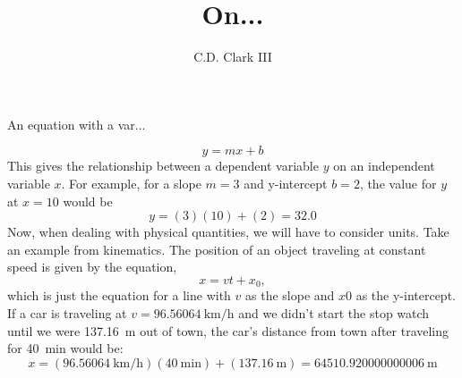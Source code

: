 \documentclass[]{article}
\author{C.D. Clark III}
\title{On...}
\begin{document}
\maketitle
An equation with a var...

$$
y = mx + b
$$
This gives the relationship between a dependent variable $y$ on an independent variable $x$.
For example, for a slope $m = 3$ and y-intercept $b = 2$, the value for $y$ at $x = 10$ would be
$$
y = (3)(10) + (2) = 32.0
$$
Now, when dealing with physical quantities, we will have to consider units. Take an example from kinematics. The
position of an object traveling at constant speed is given by the equation,
$$
x = v t + x_0,
$$
which is just the equation for a line with $v$ as the slope and $x0$ as the y-intercept. If a car is traveling at
$v = \SI[]{96.56064}{\kilo\meter\per\hour}$ and we didn't start the stop watch until we were \SI[]{137.16}{\meter} out of town, the car's distance from town
after traveling for \SI[]{40}{\minute} would be:
$$
x = (\SI[]{96.56064}{\kilo\meter\per\hour}) (\SI[]{40}{\minute}) + (\SI[]{137.16}{\meter}) = \SI[]{64510.920000000006}{\meter}
$$
\end{document}
